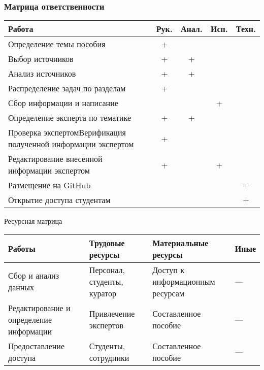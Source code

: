 \documentclass{beamer}
\begin{document}
\begin{frame}\frametitle{Матрица ответственности }
	\scriptsize
	\setlength{\tabcolsep}{3pt}
	\begin{longtable}{|m{3.5cm}|c|c|c|c|}
		\hline
		\textbf{Работа} & \textbf{Рук.} & \textbf{Анал.} & \textbf{Исп.} & \textbf{Техн.} \\ \hline
		Определение темы пособия & + & & & \\ \hline
		Выбор источников & + & + & & \\ \hline
		Анализ источников & + & + & & \\ \hline
		Распределение задач по разделам & + & & & \\ \hline
		Сбор информации и написание & & & + & \\ \hline
		Определение эксперта по тематике & + & + & & \\ \hline
		Проверка экспертомВерификация полученной информации экспертом & + & & & \\ \hline
		Редактирование внесенной информации экспертом & + & & + & \\ \hline
		Размещение на GitHub & & & & + \\ \hline
		Открытие доступа студентам & & & & + \\ \hline
	\end{longtable}
\end{frame}
\begin{frame}{Ресурсная матрица}
	\centering
	\footnotesize
	\setlength{\tabcolsep}{3pt}
	\renewcommand{\arraystretch}{1.2}
	
\begin{tabular}{|p{3cm}|p{3cm}|p{3.5cm}|p{1cm}|}
	\hline
	\textbf{Работы} & \textbf{Трудовые ресурсы} & \textbf{Материальные ресурсы} & \textbf{Иные} \\
	\hline
	Сбор и анализ данных & Персонал, студенты, куратор & Доступ к информационным ресурсам& --- \\
	\hline
	Редактирование и определение информации& Привлечение экспертов &Составленное пособие& --- \\
	\hline
	Предоставление доступа & Студенты, сотрудники &Составленное пособие & --- \\
	\hline
\end{tabular}
	
\end{frame}
\end{document}

